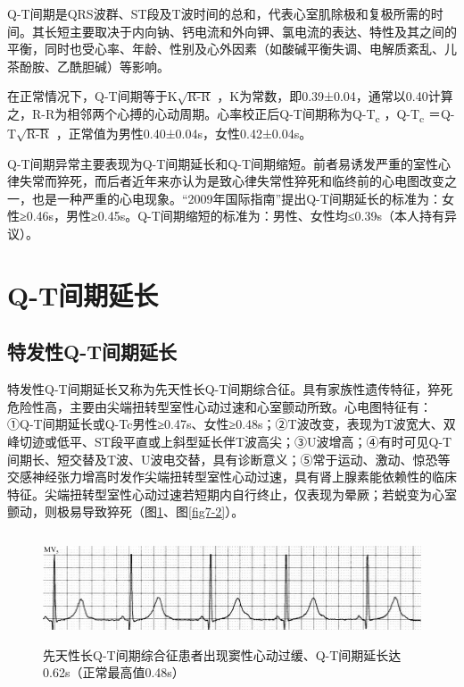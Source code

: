 Q-T间期是QRS波群、ST段及T波时间的总和，代表心室肌除极和复极所需的时间。其长短主要取决于内向钠、钙电流和外向钾、氯电流的表达、特性及其之间的平衡，同时也受心率、年龄、性别及心外因素（如酸碱平衡失调、电解质紊乱、儿茶酚胺、乙酰胆碱）等影响。

在正常情况下，Q-T间期等于K$\sqrt{\text{R-R}}$
，K为常数，即0.39±0.04，通常以0.40计算之，R-R为相邻两个心搏的心动周期。心率校正后Q-T间期称为Q-T\textsubscript{c}
，Q-T\textsubscript{c} ＝Q-T$\sqrt{\text{R-R}}$
，正常值为男性0.40±0.04s，女性0.42±0.04s。

Q-T间期异常主要表现为Q-T间期延长和Q-T间期缩短。前者易诱发严重的室性心律失常而猝死，而后者近年来亦认为是致心律失常性猝死和临终前的心电图改变之一，也是一种严重的心电现象。“2009年国际指南”提出Q-T间期延长的标准为：女性≥0.46s，男性≥0.45s。Q-T间期缩短的标准为：男性、女性均≤0.39s（本人持有异议）。

\protect\hypertarget{text00013.htmlux5cux23subid101}{}{}

\section{Q-T间期延长}

\protect\hypertarget{text00013.htmlux5cux23subid102}{}{}

\subsection{特发性Q-T间期延长}

特发性Q-T间期延长又称为先天性长Q-T间期综合征。具有家族性遗传特征，猝死危险性高，主要由尖端扭转型室性心动过速和心室颤动所致。心电图特征有：①Q-T间期延长或Q-Tc男性≥0.47s、女性≥0.48s；②T波改变，表现为T波宽大、双峰切迹或低平、ST段平直或上斜型延长伴T波高尖；③U波增高；④有时可见Q-T间期长、短交替及T波、U波电交替，具有诊断意义；⑤常于运动、激动、惊恐等交感神经张力增高时发作尖端扭转型室性心动过速，具有肾上腺素能依赖性的临床特征。尖端扭转型室性心动过速若短期内自行终止，仅表现为晕厥；若蜕变为心室颤动，则极易导致猝死（图\ref{fig7-1}、图\ref{fig7-2}）。

\begin{figure}[!htbp]
 \centering
 \includegraphics[width=5.78125in,height=1.27083in]{./images/Image00114.jpg}
 \captionsetup{justification=centering}
 \caption{先天性长Q-T间期综合征患者出现窦性心动过缓、Q-T间期延长达0.62s（正常最高值0.48s）}
 \label{fig7-1}
  \end{figure} 

